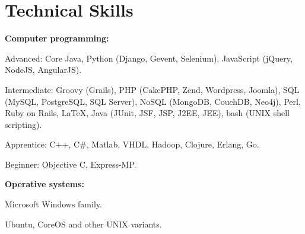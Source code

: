 


\section{Technical Skills}
%
% 
% 
\textbf{Computer programming:}

    \begin{innerlist}
\item Advanced: Core Java, Python (Django, Gevent, Selenium), JavaScript
(jQuery, NodeJS, AngularJS).
\item Intermediate: Groovy (Grails), PHP
(CakePHP, Zend, Wordpress, Joomla), SQL (MySQL, PostgreSQL, SQL Server), NoSQL (MongoDB,
CouchDB, Neo4j), Perl, Ruby on Rails, \LaTeX{}, 
Java (JUnit, JSF, JSP, J2EE, JEE), bash (UNIX shell scripting).
\item Apprentice: C$+$$+$, C\#, Matlab, VHDL, Hadoop, Clojure,
Erlang, Go.
\item Beginner: Objective C, Express-MP.
    \end{innerlist}

\halfblankline

\textbf{Operative systems:}
    \begin{innerlist}
\item Microsoft Windows family.
\item Ubuntu, CoreOS and other UNIX variants.
    \end{innerlist}

